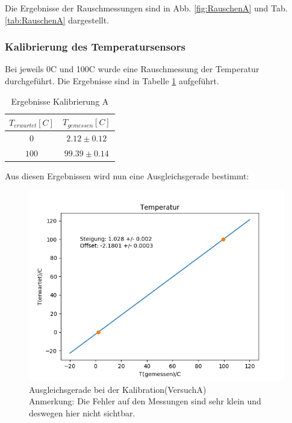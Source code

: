 \documentclass[12pt,a4paper]{article}
\begin{document}
Die Ergebnisse der Rauschmessungen sind in Abb. \ref{fig:RauschenA} und Tab. \ref{tab:RauschenA} dargestellt.

\subsubsection{Kalibrierung des Temperatursensors}
Bei jeweils 0C und 100C wurde eine Rauschmessung der Temperatur durchgeführt. Die Ergebnisse sind in Tabelle \ref{tab:KaliA} aufgeführt.

\begin{table}
\begin{center}
\begin{tabular}{|c|c|}
\hline 
$T_{erwartet}[C]$ & $T_{gemessen}[C]$ \\ 
\hline 
$0$ & $2.12\pm0.12$ \\ 
\hline 
$100$ & $99.39\pm0.14$ \\ 
\hline 
\end{tabular}
\caption[Ergebnisse Kalibrierung A]{Ergebnisse Kalibrierung A} 
\label{tab:KaliA}
\end{center}
\end{table}

Aus diesen Ergebnissen wird nun eine Ausgleichsgerade bestimmt:

\begin{figure}
\begin{center}
\includegraphics[width=\linewidth]{Bilder/KalibrationA}
\caption[Gerade Kalibration A]{Ausgleichsgerade bei der Kalibration(VersuchA)\\
Anmerkung: Die Fehler auf den Messungen sind sehr klein und deswegen hier nicht sichtbar.}
\label{fig:GeradeKaliA}
\end{center}
\end{figure}
\end{document}
